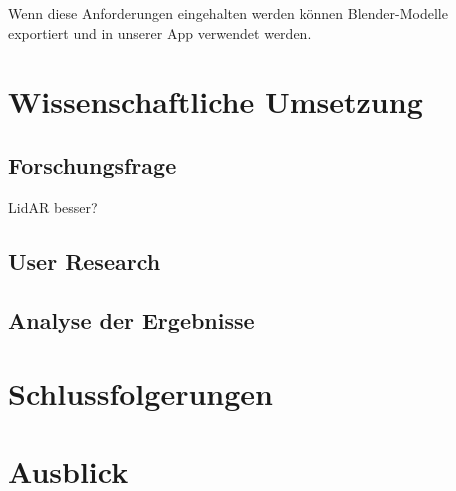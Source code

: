 \documentclass[12pt,a4paper]{article}
\begin{document}
Wenn diese Anforderungen eingehalten werden können Blender-Modelle exportiert und in unserer App verwendet werden.
\section{Wissenschaftliche Umsetzung}
\subsection{Forschungsfrage}
\glqq LidAR besser? \grqq{}
\subsection{User Research}
\subsection{Analyse der Ergebnisse}
\section{Schlussfolgerungen}
\section{Ausblick}
\end{document}

